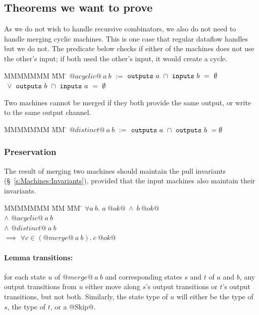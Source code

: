 \subsection{Theorems we want to prove}

As we do not wish to handle recursive combinators, we also do not need to handle merging cyclic machines.
This is one case that regular dataflow handles but we do not.
The predicate below checks if either of the machines does not use the other's input; if both used the other's input, it would create a cycle.

\begin{tabbing}
MMMMMMM \= MM \= \kill
$@acyclic@~a~b$
\> $:=$
\> $\mathtt{outputs}~a~\cap~\mathtt{inputs}~b~=~\emptyset$
\\
\> $~\vee$ \> $\mathtt{outputs}~b~\cap~\mathtt{inputs}~a~=~\emptyset$
\end{tabbing}

Two machines cannot be merged if they both provide the same output, or write to the same output channel.

\begin{tabbing}
MMMMMMM \= MM \= \kill
$@distinct@~a~b$
\> $:=$
\> $\mathtt{outputs}~a~\cap~\mathtt{outputs}~b~=\emptyset$
\end{tabbing}

\subsubsection{Preservation}
The result of merging two machines should maintain the pull invariants (\S~\ref{s:Machines:Invariants}), provided that the input machines also maintain their invariants.

\begin{tabbing}
MMMMMMM \= MM \= MM \= \kill
$\forall a~b.$
\>
\> $a~@ok@~\wedge~b~@ok@$
\\
\> $\wedge$
\> $@acyclic@~a~b$
\\
\> $\wedge$
\> $@distinct@~a~b$
\\
\> $\implies$
\> $\forall c \in (@merge@~a~b).\ c~@ok@$
\end{tabbing}

\paragraph{Lemma transitions:} for each state $u$ of $@merge@~a~b$ and corresponding states $s$ and $t$ of $a$ and $b$, any output transitions from $u$ either move along $s$'s output transitions or $t$'s output transitions, but not both.
Similarly, the state type of $u$ will either be the type of $s$, the type of $t$, or a @Skip@.

